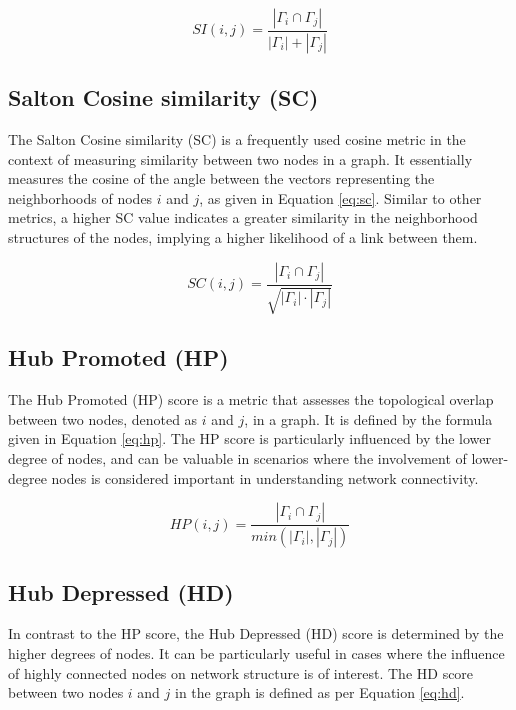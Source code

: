 \begin{equation}
\label{eq:si}
  SI(i, j) = \frac{|\Gamma_i \cap \Gamma_j|}{|\Gamma_i| + |\Gamma_j|}
\end{equation}




\subsection{Salton Cosine similarity (SC)}

The Salton Cosine similarity (SC) \cite{salton1973specification} is a frequently used cosine metric in the context of measuring similarity between two nodes in a graph. It essentially measures the cosine of the angle between the vectors representing the neighborhoods of nodes $i$ and $j$, as given in Equation \ref{eq:sc}. Similar to other metrics, a higher SC value indicates a greater similarity in the neighborhood structures of the nodes, implying a higher likelihood of a link between them.

\begin{equation}
\label{eq:sc}
  SC(i, j) = \frac{|\Gamma_i \cap \Gamma_j|}{\sqrt{|\Gamma_i| \cdot |\Gamma_j|}}
\end{equation}




\subsection{Hub Promoted (HP)}

The Hub Promoted (HP) score \cite{liben2003link} is a metric that assesses the topological overlap between two nodes, denoted as $i$ and $j$, in a graph. It is defined by the formula given in Equation \ref{eq:hp}. The HP score is particularly influenced by the lower degree of nodes, and can be valuable in scenarios where the involvement of lower-degree nodes is considered important in understanding network connectivity.

\begin{equation}
\label{eq:hp}
  HP(i, j) = \frac{|\Gamma_i \cap \Gamma_j|}{min(|\Gamma_i|, |\Gamma_j|)}
\end{equation}




\subsection{Hub Depressed (HD)}

In contrast to the HP score, the Hub Depressed (HD) score \cite{zhou2009predicting} is determined by the higher degrees of nodes. It can be particularly useful in cases where the influence of highly connected nodes on network structure is of interest. The HD score between two nodes $i$ and $j$ in the graph is defined as per Equation \ref{eq:hd}.

